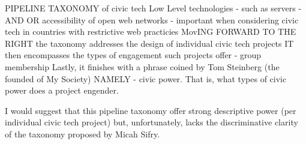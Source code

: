 PIPELINE TAXONOMY of civic tech
	Low Level technologies - such as servers - AND OR accessibility of open web networks - important when considering civic tech in countries with restrictive web practicies
	MovING FORWARD TO THE RIGHT the taxonomy addresses the design of individual civic tech projects
	IT then encompasses the types of engagement such projects offer - group membership
  Lastly, it  finishes with a phrase coined by Tom Steinberg (the founded of My Society) NAMELY - civic power. That is, what types of civic power does a project engender.
  
	I would suggest that this pipeline taxonomy offer strong descriptive power (per individual civic tech project) but, unfortunately, lacks the discriminative clarity of the taxonomy proposed by Micah Sifry.